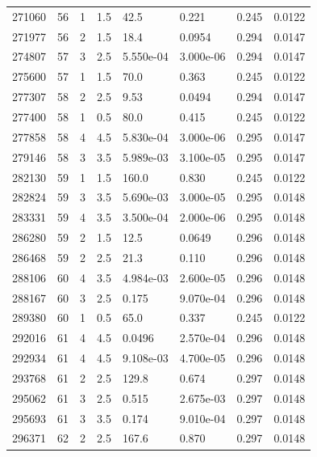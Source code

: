 \documentclass[preview]{standalone}
\begin{document}
{{{{{{\begin{tabular}{L{1.2cm}C{1.2cm} C{0.3cm}C{0.5cm} C{1.4cm}C{1.4cm} C{1.4cm}C{1.4cm}}
  271060  &    56  & 1     & 1.5 &  42.5  & 0.221  & 0.245 &  0.0122   \\ 
  271977  &    56  & 2     & 1.5 &  18.4  & 0.0954  & 0.294 &  0.0147   \\ 
  274807  &    57  & 3     & 2.5 &  5.550e-04  & 3.000e-06  & 0.294 &  0.0147   \\ 
  275600  &    57  & 1     & 1.5 &  70.0  & 0.363  & 0.245 &  0.0122   \\ 
  277307  &    58  & 2     & 2.5 &  9.53  & 0.0494  & 0.294 &  0.0147   \\ 
  277400  &    58  & 1     & 0.5 &  80.0  & 0.415  & 0.245 &  0.0122   \\ 
  277858  &    58  & 4     & 4.5 &  5.830e-04  & 3.000e-06  & 0.295 &  0.0147   \\ 
  279146  &    58  & 3     & 3.5 &  5.989e-03  & 3.100e-05  & 0.295 &  0.0147   \\ 
  282130  &    59  & 1     & 1.5 &  160.0  & 0.830  & 0.245 &  0.0122   \\ 
  282824  &    59  & 3     & 3.5 &  5.690e-03  & 3.000e-05  & 0.295 &  0.0148   \\ 
  283331  &    59  & 4     & 3.5 &  3.500e-04  & 2.000e-06  & 0.295 &  0.0148   \\ 
  286280  &    59  & 2     & 1.5 &  12.5  & 0.0649  & 0.296 &  0.0148   \\ 
  286468  &    59  & 2     & 2.5 &  21.3  & 0.110  & 0.296 &  0.0148   \\ 
  288106  &    60  & 4     & 3.5 &  4.984e-03  & 2.600e-05  & 0.296 &  0.0148   \\ 
  288167  &    60  & 3     & 2.5 &  0.175  & 9.070e-04  & 0.296 &  0.0148   \\ 
  289380  &    60  & 1     & 0.5 &  65.0  & 0.337  & 0.245 &  0.0122   \\ 
  292016  &    61  & 4     & 4.5 &  0.0496  & 2.570e-04  & 0.296 &  0.0148   \\ 
  292934  &    61  & 4     & 4.5 &  9.108e-03  & 4.700e-05  & 0.296 &  0.0148   \\ 
  293768  &    61  & 2     & 2.5 &  129.8  & 0.674  & 0.297 &  0.0148   \\ 
  295062  &    61  & 3     & 2.5 &  0.515  & 2.675e-03  & 0.297 &  0.0148   \\ 
  295693  &    61  & 3     & 3.5 &  0.174  & 9.010e-04  & 0.297 &  0.0148   \\ 
  296371  &    62  & 2     & 2.5 &  167.6  & 0.870  & 0.297 &  0.0148   \\ 

\end{tabular}}}}}}}
\end{document}
